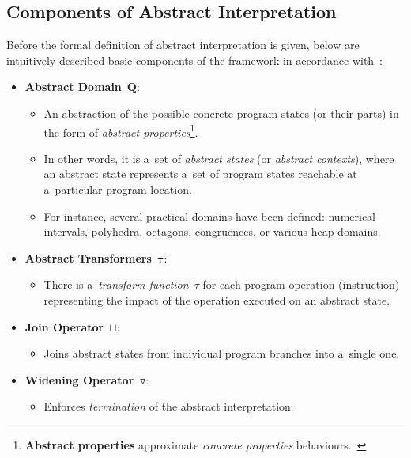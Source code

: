 \subsection{Components of Abstract Interpretation}
\label{sec:AIComponents}

Before the formal definition of abstract interpretation is given, below are intuitively described basic components of the framework in accordance with~\cite{AICousotWeb, AIBasedFormalMethodsCousot, savAI, programAnalysisNielson}:
\begin{itemize}
    \item \textbf{Abstract Domain}~$ \boldsymbol{Q} $:
        \begin{itemize}
            \item An abstraction of the possible concrete program states (or their parts) in the form of \emph{abstract properties}\footnote{\textbf{Abstract properties} approximate \emph{concrete properties} behaviours.~\cite{AIBasedFormalMethodsCousot}}.

            \item In other words, it is a~set of \emph{abstract states} (or \emph{abstract contexts}), where an abstract state represents a~set of program states reachable at a~particular program location.

            \item For instance, several practical domains have been defined: numerical intervals, polyhedra, octagons, congruences, or various heap domains.
        \end{itemize}

    \item \textbf{Abstract Transformers}~$ \boldsymbol{\tau} $:
        \begin{itemize}
            \item There is a~\emph{transform function}~$ \tau $ for each program operation (instruction) representing the impact of the operation executed on an abstract state.
        \end{itemize}

    \item \textbf{Join Operator}~$ \boldsymbol{\sqcup} $:
        \begin{itemize}
            \item Joins abstract states from individual program branches into a~single one.
        \end{itemize}

    \item \textbf{Widening Operator~$ \boldsymbol{\triangledown} $}:
        \begin{itemize}
            \item Enforces \emph{termination} of the abstract interpretation.


\end{itemize}
\end{itemize}
